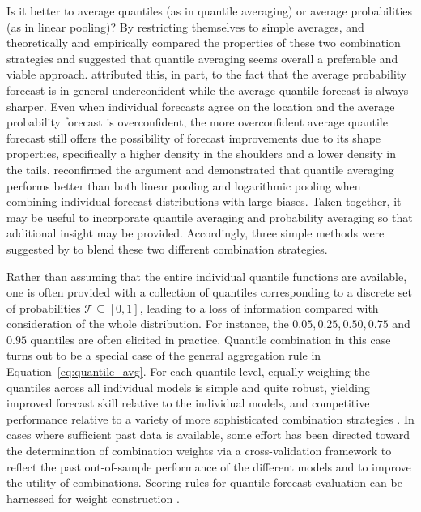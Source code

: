 \documentclass[11pt]{article}
\begin{document}
Is it better to average quantiles (as in quantile averaging) or average probabilities (as in linear pooling)? By restricting themselves to simple averages, \citet{Lichtendahl2013-rt} and \citet{Busetti2017-ox} theoretically and empirically compared the properties of these two combination strategies and suggested that quantile averaging seems overall a preferable and viable approach. \citet{Lichtendahl2013-rt} attributed this, in part, to the fact that the average probability forecast is in general underconfident while the average quantile forecast is always sharper. Even when individual forecasts agree on the location and the average probability forecast is overconfident, the more overconfident average quantile forecast still offers the possibility of forecast improvements due to its shape properties, specifically a higher density in the shoulders and a lower density in the tails. \citet{Busetti2017-ox} reconfirmed the argument and demonstrated that quantile averaging performs better than both linear pooling and logarithmic pooling when combining individual forecast distributions with large biases. Taken together, it may be useful to incorporate quantile averaging and probability averaging so that additional insight may be provided. Accordingly, three simple methods were suggested by \citet{Lichtendahl2013-rt} to blend these two different combination strategies.

Rather than assuming that the entire individual quantile functions are available, one is often provided with a collection of quantiles corresponding to a discrete set of probabilities $\mathcal{T} \subseteq [0,1]$, leading to a loss of information compared with consideration of the whole distribution. For instance, the $0.05, 0.25, 0.50, 0.75$ and $0.95$ quantiles are often elicited in practice. Quantile combination in this case turns out to be a special case of the general aggregation rule in Equation~\eqref{eq:quantile_avg}. For each quantile level, equally weighing the quantiles across all individual models is simple and quite robust, yielding improved forecast skill relative to the individual models, and competitive performance relative to a variety of more sophisticated combination strategies \citep[e.g.,][]{Busetti2017-ox,Smyl2019-av,Brooks2020-sg,Ray2020-qg}. In cases where sufficient past data is available, some effort has been directed toward the determination of combination weights via a cross-validation framework to reflect the past out-of-sample performance of the different models and to improve the utility of combinations. Scoring rules for quantile forecast evaluation can be harnessed for weight construction \citep{Gneiting2007-ij,Grushka-Cockayne2017-eg,Trapero2019-uh}. 
\end{document}
